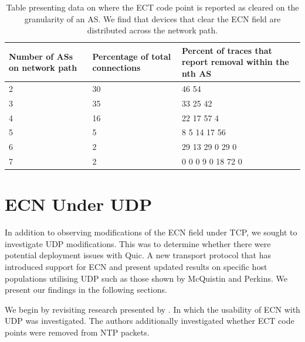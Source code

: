 \documentclass{l4proj}
\begin{document}
\begin{table}[H]
\centering
\begin{tabular}{|p{4cm}|p{4cm}|p{4cm}|}
\hline
Number of ASs on network path & Percentage of total \newline connections & Percent of traces that report  removal within the nth AS \\ \hline
2                             & 30                              & 46 54                                                   \\ \hline
3                             & 35                              & 33 25 42                                                \\ \hline
4                             & 16                              & 22 17 57 4                                             \\ \hline
5                             & 5                               & 8 5 14 17 56                                            \\ \hline
6                             & 2                               & 29 13 29 0 29 0                                         \\ \hline
7                             & 2                               & 0 0 0 9 0 18 72 0                                       \\ \hline
\end{tabular}
\caption{Table presenting data on where the ECT code point is reported as cleared on the granularity of an AS. We find that devices that clear the ECN field are distributed across the network path.}
\label{tab:asdata}
\end{table}




\section{ECN Under UDP}

In addition to observing modifications of the ECN field under TCP, we sought to investigate UDP modifications. This was to determine whether there were potential deployment issues with Quic. A new transport protocol that has introduced support for ECN and present updated results on specific host populations utilising UDP such as those shown by McQuistin and Perkins\cite{mcquistin_is_2015}. We present our findings in the following sections.

We begin by revisiting research presented by \cite{mcquistin_is_2015}. In which the usability of ECN with UDP was investigated. The authors additionally investigated whether ECT code points were removed from NTP packets.
\end{document}
